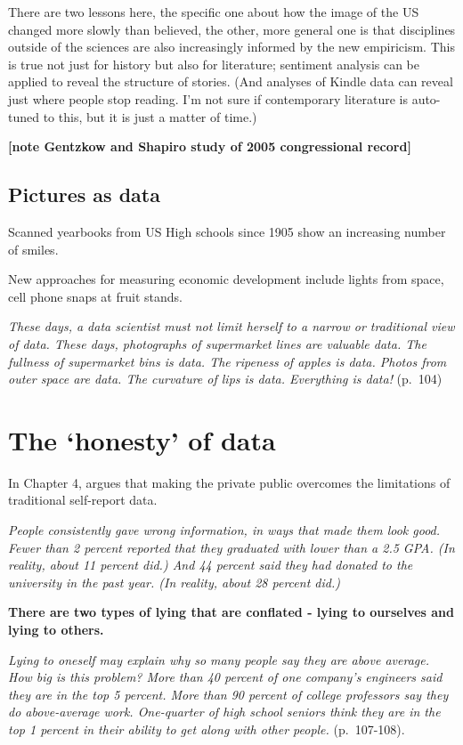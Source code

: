 \documentclass[]{book}
\theoremstyle{definition}
\theoremstyle{definition}
\theoremstyle{definition}
\theoremstyle{remark}
\begin{document}
There are two lessons here, the specific one about how the image of the
US changed more slowly than believed, the other, more general one is
that disciplines outside of the sciences are also increasingly informed
by the new empiricism. This is true not just for history but also for
literature; sentiment analysis can be applied to reveal the structure of
stories. (And analyses of Kindle data can reveal just where people stop
reading. I'm not sure if contemporary literature is auto-tuned to this,
but it is just a matter of time.)

\textbf{{[}note Gentzkow and Shapiro study of 2005 congressional
record{]}}

\section{Pictures as data}\label{pictures-as-data}

Scanned yearbooks from US High schools since 1905 show an increasing
number of smiles.

New approaches for measuring economic development include lights from
space, cell phone snaps at fruit stands.

\emph{These days, a data scientist must not limit herself to a narrow or
traditional view of data. These days, photographs of supermarket lines
are valuable data. The fullness of supermarket bins is data. The
ripeness of apples is data. Photos from outer space are data. The
curvature of lips is data. Everything is data!} (p.~104)

\chapter{\texorpdfstring{The `honesty' of
data}{The honesty of data}}\label{the-honesty-of-data}

In Chapter 4, \citet{stephens2017everybody} argues that making the
private public overcomes the limitations of traditional self-report
data.

\emph{People consistently gave wrong information, in ways that made them
look good. Fewer than 2 percent reported that they graduated with lower
than a 2.5 GPA. (In reality, about 11 percent did.) And 44 percent said
they had donated to the university in the past year. (In reality, about
28 percent did.)}

\textbf{There are two types of lying that are conflated - lying to
ourselves and lying to others.}

\emph{Lying to oneself may explain why so many people say they are above
average. How big is this problem? More than 40 percent of one company's
engineers said they are in the top 5 percent. More than 90 percent of
college professors say they do above-average work. One-quarter of high
school seniors think they are in the top 1 percent in their ability to
get along with other people.} (p.~107-108).
\end{document}
